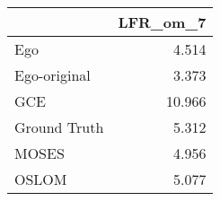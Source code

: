 \begin{tabular}{lr}
\toprule
{} & LFR_om_7 \\
\midrule
Ego          &    4.514 \\
Ego-original &    3.373 \\
GCE          &   10.966 \\
Ground Truth &    5.312 \\
MOSES        &    4.956 \\
OSLOM        &    5.077 \\
\bottomrule
\end{tabular}
